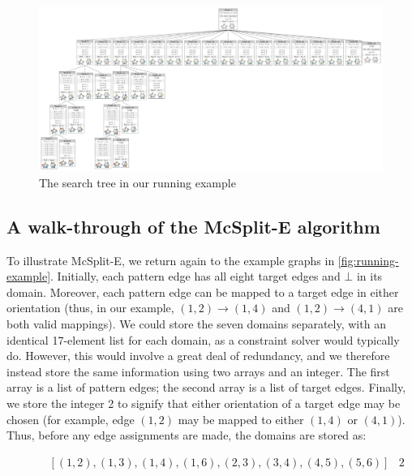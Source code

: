 \begin{landscape}
\begin{figure}[htb]
    \centering
    \includegraphics[width=1.4\textwidth]{21-mcsplite-v2/tree_a5b6}
    \caption{The search tree in our running example}
    \label{fig:search-tree-viz}
\end{figure}
\end{landscape}

\subsection{A walk-through of the McSplit-E algorithm}\label{walk-through}

To illustrate McSplit-E, we return again to the example graphs in \cref{fig:running-example}.
Initially, each pattern edge has all eight
target edges and $\bot$ in its domain.  Moreover, each pattern edge can be mapped to a target edge in either orientation
(thus, in our example, $(1,2) \rightarrow (1,4)$ and $(1,2) \rightarrow (4,1)$ are both valid mappings). 
We could store the seven domains separately, with an identical 17-element list for each domain,
as a constraint solver would typically do.
However, this would involve a great deal of redundancy, and we therefore instead store the same
information using two arrays and an integer.  The first array is a list of pattern edges;
the second array is a list of target edges. Finally, we store the integer 2 to signify that either orientation of a
target edge may be chosen (for example, edge $(1,2)$ may be mapped to either $(1,4)$ or $(4,1)$).
Thus, before any edge assignments are made, the domains are stored as:

\begin{align*}
  [(1,2), (1,3), (1,4), (1,5), (2,3), (3,4), (4,5)] & \qquad [(1,2), (1,3), (1,4), (1,6), (2,3), (3,4), (4,5), (5,6)] & 2
\end{align*}

